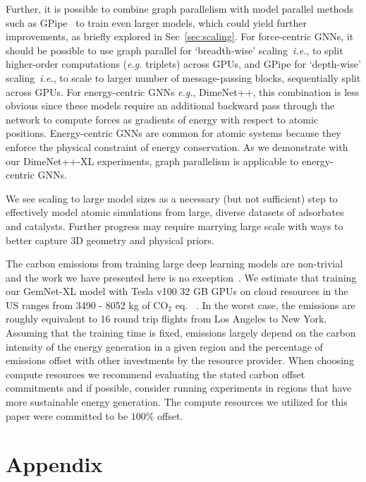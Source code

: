 \documentclass{article} \usepackage{iclr2022_conference,times}
\begin{document}
Further, it is possible to combine graph parallelism with model parallel methods such as GPipe~\citep{huang2019gpipe}
to train even larger models, which could yield further improvements,
as briefly explored in Sec~\ref{sec:scaling}.
For force-centric GNNs,
it should be possible to use graph parallel for `breadth-wise' scaling~\textit{i.e.}, to split higher-order computations (\textit{e.g.} triplets)
across GPUs, and GPipe for `depth-wise' scaling~\textit{i.e.}, to scale to larger number of message-passing blocks,
sequentially split across GPUs.
For energy-centric GNNs \textit{e.g.}, DimeNet++, this combination is less obvious since these models
require an additional backward pass through the network to compute forces as gradients of
energy with respect to atomic positions.
Energy-centric GNNs are common for atomic systems because they enforce the physical constraint of energy conservation.
As we demonstrate with our DimeNet++-XL experiments, graph parallelism is applicable to energy-centric GNNs.

We see scaling to large model sizes as a necessary (but not sufficient) step to effectively
model atomic simulations from large, diverse datasets of adsorbates and catalysts.
Further progress may require marrying large scale with ways to better capture 3D geometry and physical priors.

The carbon emissions from training large deep learning models are non-trivial and the work we have presented here is no exception~\citep{strubell_arxiv19, schwartz_arxiv19}. We estimate that training our GemNet-XL model with Tesla v100 32 GB GPUs on cloud resources in the US ranges from 3490 - 8052 kg of CO$_2$ eq. ~\citep{lacoste2019quantifying}. In the worst case, the emissions are roughly equivalent to 16 round trip flights from Los Angeles to New York. Assuming that the training time is fixed, emissions largely depend on the carbon intensity of the energy generation in a given region and the percentage of emissions offset with other investments by the resource provider. When choosing compute resources we recommend evaluating the stated carbon offset commitments and if possible, consider running experiments in regions that have more sustainable energy generation.
The compute resources we utilized for this paper were committed to be $100\%$ offset.




\clearpage

\appendix
\section{Appendix}
\end{document}
